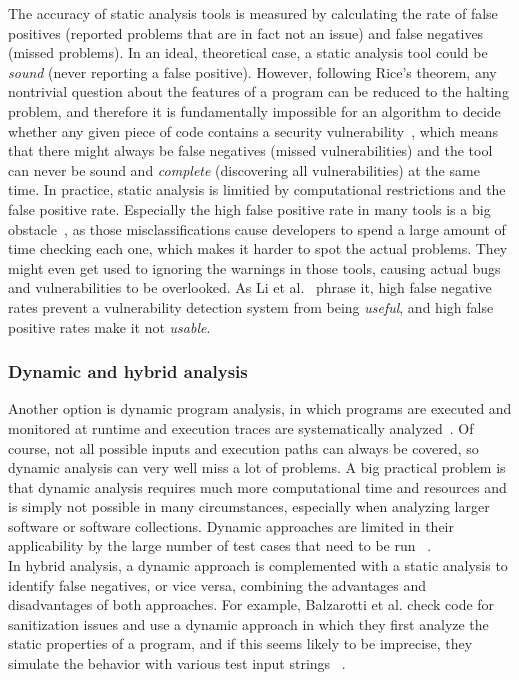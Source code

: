 \documentclass[
a4paper,
pagesize,
pdftex,
12pt,
twoside, %
BCOR=5mm, %
ngerman,
fleqn,
final,
]{scrartcl}
\begin{document}
	The accuracy of static analysis tools is measured by calculating the rate of false positives (reported problems that are in fact not an issue) and false negatives (missed problems). In an ideal, theoretical case, a static analysis tool could be \textit{sound} (never reporting a false positive). However, following Rice's theorem, any nontrivial question about the features of a program can be reduced to the halting problem, and therefore it is fundamentally impossible for an algorithm to decide whether any given piece of code contains a security vulnerability~\cite{Chess.2004}, which means that there might always be false negatives (missed vulnerabilities) and the tool can never be sound and \textit{complete} (discovering all vulnerabilities) at the same time. In practice, static analysis is limitied by computational restrictions and the false positive rate. Especially the high false positive rate in many tools is a big obstacle~\cite{Liu.2018}, as those misclassifications cause developers to spend a large amount of time checking each one, which makes it harder to spot the actual problems. They might even get used to ignoring the warnings in those tools, causing actual bugs and vulnerabilities to be overlooked. As Li et al.~\cite{Li.2005} phrase it, high false negative rates prevent a vulnerability detection system from being \textit{useful}, and high false positive rates make it not \textit{usable}.\\
	
	\subsubsection{Dynamic and hybrid analysis}
	Another option is dynamic program analysis, in which programs are executed and monitored at runtime and execution traces are systematically analyzed~\cite{Shar.2013c}. Of course, not all possible inputs and execution paths can always be covered, so dynamic analysis can very well miss a lot of problems. A big practical problem is that dynamic analysis requires much more computational time and resources and is simply not possible in many circumstances, especially when analyzing larger software or software collections. Dynamic approaches are limited in their applicability by the large number of test cases that need to be run ~\cite{Aggarwal.2006}.\\
	In hybrid analysis, a dynamic approach is complemented with a static analysis to identify false negatives, or vice versa, combining the advantages and disadvantages of both approaches. For example, Balzarotti et al. check code for sanitization issues and use a dynamic approach in which they first analyze the static properties of a program, and if this seems likely to be imprecise, they simulate the behavior with various test input strings ~\cite{Balzarotti.2008}. 
	
\end{document}
